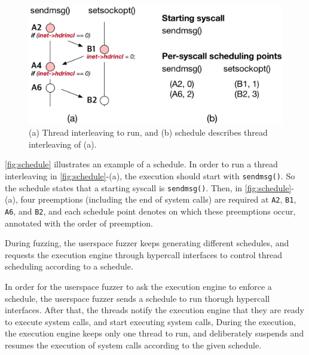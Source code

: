 \begin{figure}[t]
  \centering
  \includegraphics[width=0.9\linewidth]{fig/schedule.pdf}
  \caption{(a) Thread interleaving to run, and (b) schedule describes
    thread interleaving of (a). }
  \label{fig:schedule}
\end{figure}

\autoref{fig:schedule} illustrates an example of a schedule. In order
to run a thread interleaving in \autoref{fig:schedule}-(a), the
execution should start with \texttt{sendmsg()}. So the schedule states
that a starting syscall is \texttt{sendmsg()}.
%
Then, in \autoref{fig:schedule}-(a), four preemptions (including the
end of system calls) are required at \texttt{A2}, \texttt{B1},
\texttt{A6}, and \texttt{B2}, and each schedule point denotes on which
these preemptions occur, annotated with the order of preemption.


During fuzzing, the userspace fuzzer keeps generating different
schedules, and requests the execution engine through hypercall
interfaces to control thread scheduling according to a schedule.





%
In order for the userspace fuzzer to ask the execution engine to
enforce a schedule, the userspace fuzzer sends a schedule to run
thorugh hypercall interfaces.
%
After that, the threads notify the execution engine that they are
ready to execute system calls, and start executing system calls,
%
During the execution, the execution engine keeps only one thread to
run, and deliberately suspends and resumes the execution of system
calls according to the given schedule.

